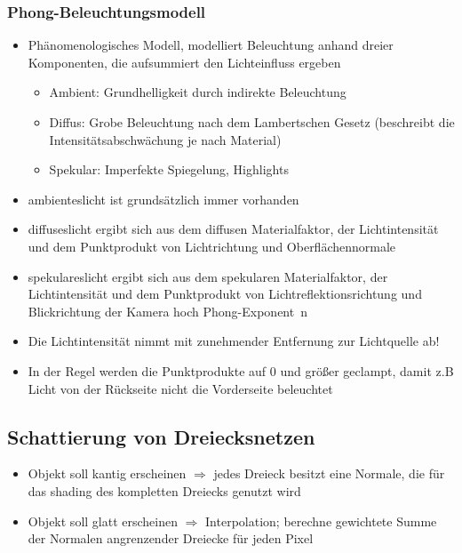 \documentclass[10pt,a4paper]{article}
\begin{document}
	\subsubsection{Phong-Beleuchtungsmodell}
	\begin{itemize}
		\item Phänomenologisches Modell, modelliert Beleuchtung anhand dreier Komponenten, die aufsummiert den Lichteinfluss ergeben
		\begin{itemize}
			\item Ambient: Grundhelligkeit durch indirekte Beleuchtung
			\item Diffus: Grobe Beleuchtung nach dem Lambertschen Gesetz (beschreibt die Intensitätsabschwächung je nach Material)
			\item Spekular: Imperfekte Spiegelung, \glqq Highlights\grqq
		\end{itemize}
		\item \Gls{ambienteslicht} ist grundsätzlich immer vorhanden
		\item \Gls{diffuseslicht} ergibt sich aus dem diffusen Materialfaktor, der Lichtintensität und dem Punktprodukt von Lichtrichtung und Oberflächennormale
		\item \Gls{spekulareslicht} ergibt sich aus dem spekularen Materialfaktor, der Lichtintensität und dem Punktprodukt von Lichtreflektionsrichtung und Blickrichtung der Kamera hoch \glqq Phong-Exponent\grqq\ n
		\item Die Lichtintensität nimmt mit zunehmender Entfernung zur Lichtquelle ab!
		\item In der Regel werden die Punktprodukte auf 0 und größer \glqq geclampt\grqq, damit z.B Licht von der Rückseite nicht die Vorderseite beleuchtet
	\end{itemize}

	\subsection{Schattierung von Dreiecksnetzen}
	\begin{itemize}
		\item Objekt soll kantig erscheinen $\Rightarrow$ jedes Dreieck besitzt eine Normale, die für das \Gls{shading} des kompletten Dreiecks genutzt wird
		\item Objekt soll glatt erscheinen $\Rightarrow$ Interpolation; berechne gewichtete Summe der Normalen angrenzender Dreiecke für jeden Pixel
	\end{itemize}
\end{document}
